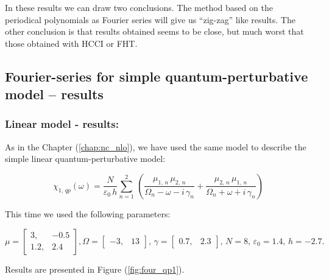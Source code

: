 \documentclass[12pt,twoside,a4paper]{article}
\numberwithin{equation}{subsection}
\numberwithin{figure}{subsection}
\begin{document}
In these results we can draw two conclusions. The method based on the periodical polynomials as Fourier series will give us ``zig-zag'' like results. The other conclusion is that results obtained seems to be close, but much worst that those obtained with HCCI or FHT. 

\subsection{Fourier-series for simple quantum-perturbative model -- results} \label{chap:fourier_quantum}

\subsubsection*{Linear model - results:}

As in the Chapter (\ref{chap:nc_nlo}), we have used the same model to describe the simple linear quantum-perturbative model: 

\begin{equation} \label{eq:four_qp}
  \chi_{1, \,qp} (\omega ) = \frac {N}{\varepsilon_0 \, h} \sum_{n=1}^{2} \, 
  	\left(
  		\frac {\mu_{1, \,n} \, \mu_{2, \, n}}{\Omega_n - \omega - i \, \gamma_n} 
  	  + \frac {\mu_{2, \,n} \, \mu_{1, \, n}}{\Omega_n + \omega + i \, \gamma_n}
	\right)
\end{equation}

This time we used the following parameters: 

\begin{equation}
  \mu = \begin{bmatrix} 
    3,   & - 0.5 \\ 
    1.2, &   2.4
  \end{bmatrix},
  \Omega = \begin{bmatrix} 
    - 3, & 13
  \end{bmatrix}, \,
  \gamma = \begin{bmatrix} 
    0.7, & 2.3
  \end{bmatrix}, \,
  N = 8, \,
  \varepsilon_{0} = 1.4, \,
  h = - 2.7.
\end{equation} 

Results are presented in Figure (\ref{fig:four_qp1}). 
\end{document}

